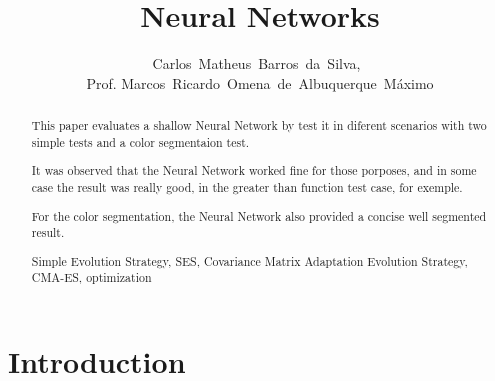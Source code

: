 \documentclass[journal]{IEEEtran}
\begin{document}
    \title{Neural Networks}
  \author{Carlos~Matheus~Barros~da~Silva,~\\Prof. Marcos~Ricardo~Omena~de~Albuquerque~Máximo}


\maketitle



\begin{abstract}

This paper evaluates a shallow Neural Network by test it in diferent scenarios with two simple tests and a color segmentaion test.

It was observed that the Neural Network worked fine for those porposes, and in some case the result was really good, in the greater than function test case, for exemple.

For the color segmentation, the Neural Network also provided a concise well segmented result.

\begin{IEEEkeywords}
    Simple Evolution Strategy, SES, Covariance Matrix Adaptation Evolution Strategy, CMA-ES, optimization
\end{IEEEkeywords}
\end{abstract}

\IEEEpeerreviewmaketitle



\section{Introduction}
\end{document}
